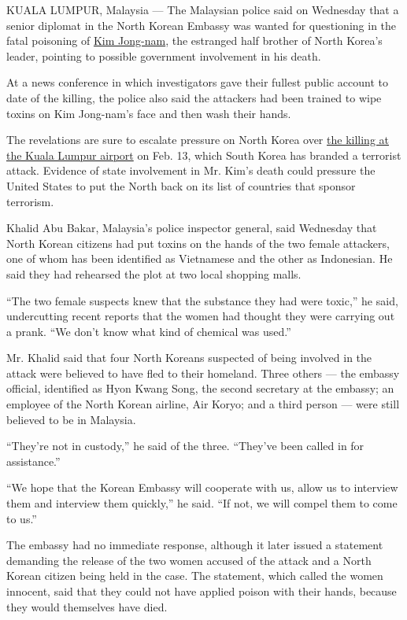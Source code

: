 KUALA LUMPUR, Malaysia --- The Malaysian police said on Wednesday that a
senior diplomat in the North Korean Embassy was wanted for questioning
in the fatal poisoning of
\href{https://www.nytimes3xbfgragh.onion/2017/02/15/world/asia/kim-jong-nam-assassination-north-korea.html}{Kim
Jong-nam}, the estranged half brother of North Korea's leader, pointing
to possible government involvement in his death.

At a news conference in which investigators gave their fullest public
account to date of the killing, the police also said the attackers had
been trained to wipe toxins on Kim Jong-nam's face and then wash their
hands.

The revelations are sure to escalate pressure on North Korea over
\href{https://www.nytimes3xbfgragh.onion/2017/02/14/world/asia/kim-jong-un-brother-killed-malaysia.html}{the
killing at the Kuala Lumpur airport} on Feb. 13, which South Korea has
branded a terrorist attack. Evidence of state involvement in Mr. Kim's
death could pressure the United States to put the North back on its list
of countries that sponsor terrorism.

Khalid Abu Bakar, Malaysia's police inspector general, said Wednesday
that North Korean citizens had put toxins on the hands of the two female
attackers, one of whom has been identified as Vietnamese and the other
as Indonesian. He said they had rehearsed the plot at two local shopping
malls.

``The two female suspects knew that the substance they had were toxic,''
he said, undercutting recent reports that the women had thought they
were carrying out a prank. ``We don't know what kind of chemical was
used.''

Mr. Khalid said that four North Koreans suspected of being involved in
the attack were believed to have fled to their homeland. Three others
--- the embassy official, identified as Hyon Kwang Song, the second
secretary at the embassy; an employee of the North Korean airline, Air
Koryo; and a third person --- were still believed to be in Malaysia.

``They're not in custody,'' he said of the three. ``They've been called
in for assistance.''

``We hope that the Korean Embassy will cooperate with us, allow us to
interview them and interview them quickly,'' he said. ``If not, we will
compel them to come to us.''

The embassy had no immediate response, although it later issued a
statement demanding the release of the two women accused of the attack
and a North Korean citizen being held in the case. The statement, which
called the women innocent, said that they could not have applied poison
with their hands, because they would themselves have died.

